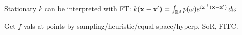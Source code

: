 \begin{definition}[RFF]
    Stationary \(k\) can be interpreted with FT: \(k(\vb{x}-\vb{x}') = \int_{\mathbb{R}^d} p(\omega) e^{i \omega^\top(\vb{x} - \vb{x}')} \, d\omega\)
\end{definition}

\begin{definition}
    Get \(f\) vals at points by sampling/heuristic/equal space/hyperp. SoR, FITC.
\end{definition}
